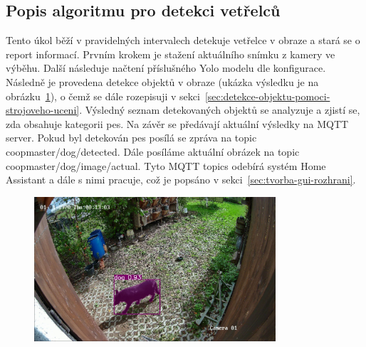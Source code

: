 \subsection*{Popis algoritmu pro detekci vetřelců}
Tento úkol běží v pravidelných intervalech detekuje vetřelce v obraze a stará se o report informací.
Prvním krokem je stažení aktuálního snímku z kamery ve výběhu.
Další následuje načtení příslušného Yolo modelu dle konfigurace.
Následně je provedena detekce objektů v obraze (ukázka výsledku je na obrázku~\ref{fig:dog_detected}), o čemž se dále rozepisuji v sekci~\ref{sec:detekce-objektu-pomoci-strojoveho-uceni}.
Výsledný seznam detekovaných objektů se analyzuje a zjistí se, zda obsahuje kategorii pes.
Na závěr se předávají aktuální výsledky na MQTT server.
Pokud byl detekován pes posílá se zpráva na topic coopmaster/dog/detected.
Dále posíláme aktuální obrázek na topic coopmaster/dog/image/actual.
Tyto MQTT topics odebírá systém Home Assistant a dále s nimi pracuje, což je popsáno v sekci~\ref{sec:tvorba-gui-rozhrani}.

\begin{figure}[H]
    \centering
    \includegraphics[width=0.8\textwidth]{img/dog_detected}
    \label{fig:dog_detected}
\end{figure}



